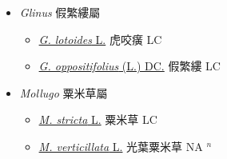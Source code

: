 
  \begin{itemize}
 \item[] \textit{Glinus} 假繁縷屬
                    
  \begin{itemize}
        \item[] \href{http://www.theplantlist.org/tpl1.1/search?q=Glinus+lotoides}{\textit{G. lotoides} L.}   虎咬癀 LC
        \item[] \href{http://www.theplantlist.org/tpl1.1/search?q=Glinus+oppositifolius}{\textit{G. oppositifolius} (L.) DC.}   假繁縷 LC
  \end{itemize}
 \item[] \textit{Mollugo} 粟米草屬
                    
  \begin{itemize}
        \item[] \href{http://www.theplantlist.org/tpl1.1/search?q=Mollugo+stricta}{\textit{M. stricta} L.}   粟米草 LC
        \item[] \href{http://www.theplantlist.org/tpl1.1/search?q=Mollugo+verticillata}{\textit{M. verticillata} L.}   光葉粟米草 NA $^n$
  \end{itemize}
  \end{itemize}
